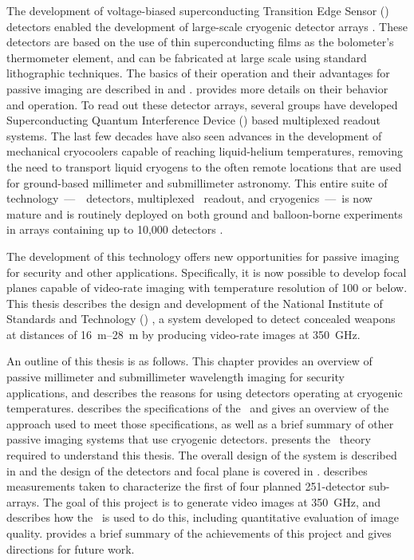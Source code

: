 The development of voltage-biased superconducting Transition Edge Sensor (\TES) detectors enabled the development of large-scale cryogenic detector arrays \cite{irwin_application_1995}.
These detectors are based on the use of thin superconducting films as the bolometer's thermometer element, and can be fabricated at large scale using standard lithographic techniques.
The basics of their operation and their advantages for passive imaging are described in  and .
 provides more details on their behavior and operation.
To read out these detector arrays, several groups have developed Superconducting Quantum Interference Device (\SQUID) based multiplexed readout systems.
The last few decades have also seen advances in the development of mechanical cryocoolers capable of reaching liquid-helium temperatures, removing the need to transport liquid cryogens to the often remote locations that are used for ground-based millimeter and submillimeter astronomy.
This entire suite of technology~---~\TES\ detectors, multiplexed \SQUID\ readout, and cryogenics~---~is now mature and is routinely deployed on both ground and balloon-borne experiments in arrays containing up to 10,000 detectors \cite{holland_scuba-2:_2013}.

The development of this technology offers new opportunities for passive imaging for security and other applications.
Specifically, it is now possible to develop focal planes capable of video-rate imaging with temperature resolution of \SI{100}{\mK} or below.
This thesis describes the design and development of the National Institute of Standards and Technology (\NIST) \Imager, a system developed to detect concealed weapons at distances of \SIrange{16}{28}{\m} by producing video-rate images at \SI{350}{\GHz}.

An outline of this thesis is as follows.
This chapter provides an overview of passive millimeter and submillimeter wavelength imaging for security applications, and describes the reasons for using detectors operating at cryogenic temperatures.
 describes the specifications of the \Imager\ and gives an overview of the approach used to meet those specifications, as well as a brief summary of other passive imaging systems that use cryogenic detectors.
 presents the \TES\ theory required to understand this thesis.
The overall design of the system is described in  and the design of the detectors and focal plane is covered in .
 describes measurements taken to characterize the first of four planned 251-detector sub-arrays.
The goal of this project is to generate video images at \SI{350}{\GHz}, and  describes how the \Imager\ is used to do this, including quantitative evaluation of image quality.
 provides a brief summary of the achievements of this project and gives directions for future work.


